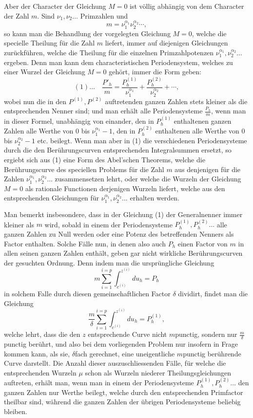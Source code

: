 \documentclass[10pt]{article}
\begin{document}
Aber der Character der Gleichung \(M=0\) ist völlig abhängig von dem Character der Zahl \(m\). Sind \(\nu_1,\nu_2\ldots\) Primzahlen und
\[
m=\nu_1^{\alpha_1}\nu_2^{\alpha_2}\cdots,
\]
so kann man die Behandlung der vorgelegten Gleichung \(M=0\), welche die specielle Theilung für die Zahl \(m\) liefert, immer auf diejenigen Gleichungen zurückführen, welche die Theilung für die einzelnen Primzahlpotenzen \(\nu_1^{\alpha_1},\nu_2^{\alpha_2}\ldots\) ergeben. Denn man kann dem characteristischen Periodensystem, welches zu einer Wurzel der Gleichung \(M=0\) gehört, immer die Form geben:
\[
(1)\ldots\quad
\frac{P'_h}{m}
=
\frac{P_h^{(1)}}{\nu_1^{\alpha_1}}
+
\frac{P_h^{(2)}}{\nu_2^{\alpha_2}}
+\cdots,
\]
wobei nun die in den \(P^{(1)},P^{(2)}\) auftretenden ganzen Zahlen stets kleiner als die entsprechenden Nenner sind; und man erhält alle Periodensysteme \(\frac{P_h}{m}\), wenn man in dieser Formel, unabhängig von einander, den in \(P_h^{(1)}\) enthaltenen ganzen Zahlen alle Werthe von \(0\) bis \(\nu_1^{\alpha_1}-1\), den in \(P_h^{(2)}\) enthaltenen alle Werthe von \(0\) bis \(\nu_2^{\alpha_2}-1\) etc. beilegt. Wenn man aber in (1) die verschiedenen Periodensysteme durch die den Berührungscurven entsprechenden Integralsummen ersetzt, so ergiebt sich aus (1) eine Form des Abel'schen Theorems, welche die Berührungscurve des speciellen Problems für die Zahl \(m\) aus denjenigen für die Zahlen \(\nu_1^{\alpha_1},\nu_2^{\alpha_2}\ldots\) zusammensetzen lehrt, oder welche die Wurzeln der Gleichung \(M=0\) als rationale Functionen derjenigen Wurzeln liefert, welche aus den entsprechenden Gleichungen für \(\nu_1^{\alpha_1},\nu_2^{\alpha_2}\ldots\) erhalten werden.

Man bemerkt insbesondere, dass in der Gleichung (1) der Generalnenner immer kleiner als \(m\) wird, sobald in einem der Periodensysteme \(P_h^{(1)},P_h^{(2)}\ldots\) alle ganzen Zahlen zu Null werden oder eine Potenz des betreffenden Nenners als Factor enthalten. Solche Fälle nun, in denen also auch \(P_h\) einen Factor von \(m\) in allen seinen ganzen Zahlen enthält, geben gar nicht wirkliche Berührungscurven der gesuchten Ordnung. Denn indem man die ursprüngliche Gleichung
\[
m\sum_{i=1}^{i=p}\int_{c^{(i)}}^{z^{(i)}}du_h=P_h
\]
in solchem Falle durch diesen gemeinschaftlichen Factor \(\delta\) dividirt, findet man die Gleichung
\[
\frac{m}{\delta}\sum_{i=1}^{i=p}\int_{c^{(i)}}^{z^{(i)}}du_h=P_h^{(1)},
\]
welche lehrt, dass die den \(z\) entsprechende Curve nicht \(m\)punctig, sondern nur \(\frac{m}{\delta}\)punctig berührt, und also bei dem vorliegenden Problem nur insofern in Frage kommen kann, als sie, \(\delta\)fach gerechnet, eine uneigentliche \(m\)punctig berührende Curve darstellt. Die Anzahl dieser auszuschliessenden Fälle, für welche die entsprechenden Wurzeln \(\mu\) schon als Wurzeln niederer Theilungsgleichungen auftreten, erhält man, wenn man in einem der Periodensysteme \(P_h^{(1)},P_h^{(2)}\ldots\) den ganzen Zahlen nur Werthe beilegt, welche durch den entsprechenden Primfactor theilbar sind, während die ganzen Zahlen der übrigen Periodensysteme beliebig bleiben.
\end{document}
